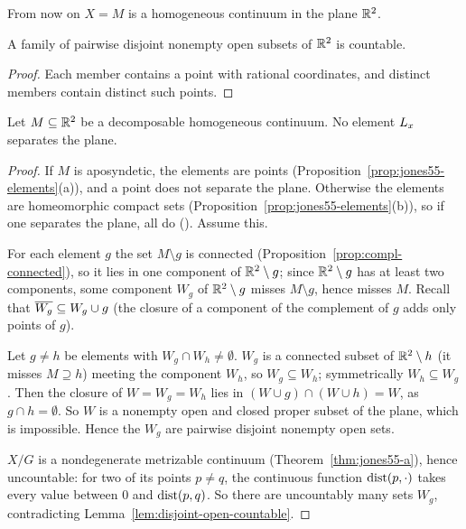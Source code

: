 From now on $X=M$ is a homogeneous continuum in the plane $\mathbb{R}^2$.

\begin{lemma}\label{lem:disjoint-open-countable}
A family of pairwise disjoint nonempty open subsets of $\mathbb{R}^2$ is countable.
\end{lemma}

\begin{proof}
Each member contains a point with rational coordinates, and distinct members contain distinct such points.
\end{proof}


\begin{theorem}\label{thm:elt-not-separates}
Let $M\subseteq\mathbb{R}^2$ be a decomposable homogeneous continuum. No element $L_{x}$ separates the plane.
\end{theorem}

\begin{proof}
If $M$ is aposyndetic, the elements are points (Proposition~\ref{prop:jones55-elements}(a)), and a point does not
separate the plane. Otherwise the elements are homeomorphic compact sets
(Proposition~\ref{prop:jones55-elements}(b)), so if one separates the plane, all do (). Assume this.

For each element $g$ the set $M\setminus g$ is connected (Proposition~\ref{prop:compl-connected}), so it lies in one
component of $\mathbb{R}^2\setminus g$; since $\mathbb{R}^2\setminus g$ has at least two components, some component $W_g$ of $\mathbb{R}^2\setminus g$
misses $M\setminus g$, hence misses $M$. Recall that $\overline{W_g}\subseteq W_g\cup g$ (the closure of a component of the
complement of $g$ adds only points of $g$).

Let $g\ne h$ be elements with $W_g\cap W_h\ne\emptyset$. $W_g$ is a connected subset of $\mathbb{R}^2\setminus h$ (it misses $M\supseteq h$)
meeting the component $W_h$, so $W_g\subseteq W_h$; symmetrically $W_h\subseteq W_g$. Then the closure of $W=W_g=W_h$ lies in
$(W\cup g)\cap(W\cup h)=W$, as $g\cap h=\emptyset$. So $W$ is a nonempty open and closed proper subset of the plane, which is
impossible. Hence the $W_g$ are pairwise disjoint nonempty open sets.

$X/G$ is a nondegenerate metrizable continuum (Theorem~\ref{thm:jones55-a}), hence uncountable: for two of its points
$p\ne q$, the continuous function $\operatorname{dist}(p,\cdot)$ takes every value between $0$ and $\operatorname{dist}(p,q)$. So there are
uncountably many sets $W_g$, contradicting Lemma~\ref{lem:disjoint-open-countable}.
\end{proof}

